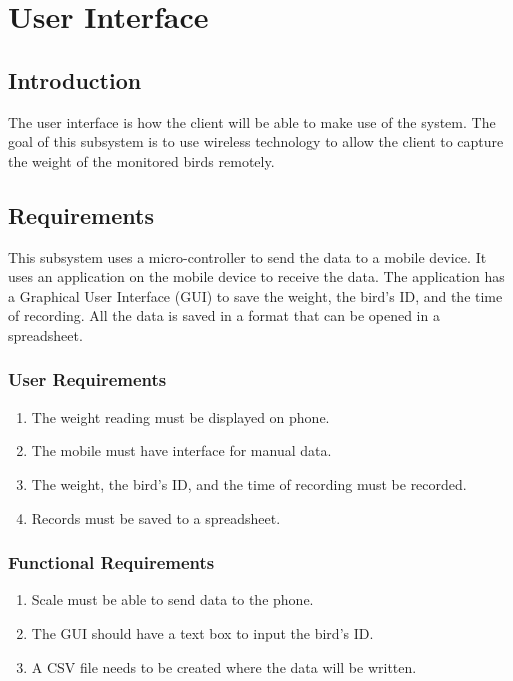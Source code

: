 \documentclass[class=report,11pt,crop=false]{standalone}
\begin{document}
	\chapter{User Interface \label{ch:user-interface}}
	
	\vspace{0.5cm}
	
	\section{Introduction}
		The user interface is how the client will be able to make use of the system. %
		The goal of this subsystem is to use wireless technology to allow the client to capture the weight of the monitored birds remotely.
	
	\section{Requirements}
		
		This subsystem uses a micro-controller to send the data to a mobile device. It uses an application on the mobile device to receive the data. The application has a Graphical User Interface (GUI) to save the weight, the bird's ID, and the time of recording. All the data is saved in a format that can be opened in a spreadsheet. %
	
		\subsection{User Requirements}
		\begin{enumerate}
			\item The weight reading must be displayed on phone.
			\item The mobile must have interface for manual data.
			\item The weight, the bird's ID, and the time of recording must be recorded.
			\item Records must be saved to a spreadsheet.
		\end{enumerate}
		
		\subsection{Functional Requirements}
			\begin{enumerate}
				\item Scale must be able to send data to the phone.
				\item The GUI should have a text box to input the bird's ID.
				\item A CSV file needs to be created where the data will be written.
			\end{enumerate}
			
\end{document}
